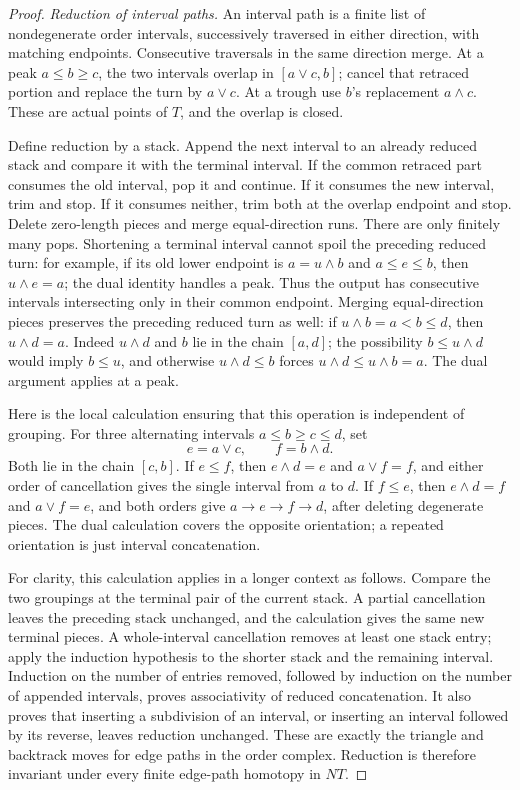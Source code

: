 \begin{proof}
\emph{Reduction of interval paths.}
An interval path is a finite list of nondegenerate order
intervals, successively traversed in either direction, with
matching endpoints. Consecutive traversals in the same direction
merge. At a peak $a\le b\ge c$, the two intervals overlap in
$[a\vee c,b]$; cancel that retraced portion and replace the turn
by $a\vee c$. At a trough use $b$'s replacement $a\wedge c$.
These are actual points of $T$, and the overlap is closed.

Define reduction by a stack. Append the next interval to an
already reduced stack and compare it with the terminal interval.
If the common retraced part consumes the old interval, pop it
and continue. If it consumes the new interval, trim and stop.
If it consumes neither, trim both at the overlap endpoint and
stop. Delete zero-length pieces and merge equal-direction runs.
There are only finitely many pops. Shortening a terminal interval
cannot spoil the preceding reduced turn: for example, if its
old lower endpoint is $a=u\wedge b$ and $a\le e\le b$, then
$u\wedge e=a$; the dual identity handles a peak. Thus the output
has consecutive intervals intersecting only in their common
endpoint. Merging equal-direction pieces preserves the preceding
reduced turn as well: if $u\wedge b=a<b\le d$, then
$u\wedge d=a$. Indeed $u\wedge d$ and $b$ lie in the chain
$[a,d]$; the possibility $b\le u\wedge d$ would imply
$b\le u$, and otherwise $u\wedge d\le b$ forces
$u\wedge d\le u\wedge b=a$. The dual argument applies
at a peak.

Here is the local calculation ensuring that this operation is
independent of grouping. For three alternating intervals
$a\le b\ge c\le d$, set
\[
 e=a\vee c,\qquad f=b\wedge d.
\]
Both lie in the chain $[c,b]$. If $e\le f$, then
$e\wedge d=e$ and $a\vee f=f$, and either order of cancellation
gives the single interval from $a$ to $d$. If $f\le e$, then
$e\wedge d=f$ and $a\vee f=e$, and both orders give
$a\to e\to f\to d$, after deleting degenerate pieces.
The dual calculation covers the opposite orientation; a repeated
orientation is just interval concatenation.

For clarity, this calculation applies in a longer context as
follows. Compare the two groupings at the terminal pair of the
current stack. A partial cancellation leaves the preceding stack
unchanged, and the calculation gives the same new terminal
pieces. A whole-interval cancellation removes at least one stack
entry; apply the induction hypothesis to the shorter stack and
the remaining interval. Induction on the number of entries
removed, followed by induction on the number of appended
intervals, proves associativity of reduced concatenation.
It also proves that inserting a subdivision of an interval, or
inserting an interval followed by its reverse, leaves reduction
unchanged. These are exactly the triangle and backtrack moves
for edge paths in the order complex. Reduction is therefore
invariant under every finite edge-path homotopy in $NT$.


\end{proof}
